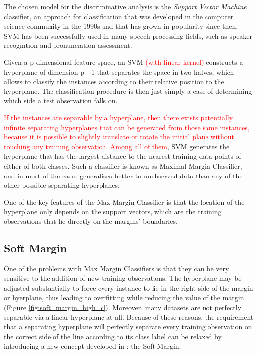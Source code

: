 
The chosen model for the discriminative analysis is the \textit{Support Vector Machine} classifier,
an approach for classification that was developed in the computer science community in the 1990s
and that has grown in popularity since then. SVM has been successfully used in many
speech processing fields, such as speaker recognition and pronunciation assessment.

Given a p-dimensional feature space, an SVM \textcolor{red}{(with linear kernel)}
constructs a hyperplane of dimension p - 1
that separates the space in two halves, which allows to classify the instances according
to their relative position to the hyperplane. The classification
procedure is then just simply a case of determining which side a test observation falls on.

\textcolor{red}{
If the instances are separable by a hyperplane, then there exists potentially infinite
separating hyperplanes that can be generated from those same instances, because it
is possible to slightly translate or rotate the initial plane without touching any training
observation. Among all of them}, SVM generates the hyperplane that has the largest
distance to the nearest training data points of either of both classes. Such a classifier
is known as Maximal Margin Classifier, and in most of the cases generalizes better to
unobserved data than any of the other possible separating hyperplanes.

One of the key features of the Max Margin Classifier is that the location of the hyperplane
only depends on the support vectors, which are the training observations that lie directly
on the margins' boundaries.

\subsection{Soft Margin}

One of the problems with Max Margin Classifiers is that they can be very sensitive to the
addition of new training observations: The hyperplane may be adjusted substantially
to force every instance to lie in the right side of the margin or hyerplane, thus leading
to overfitting while reducing the value of the margin (Figure \ref{fig:soft_margin_high_c}).
Moreover, many datasets are not perfectly separable via a linear hyperplane at all.
Because of these reasons, the requirement that a separating hyperplane will perfectly separate
every training observation on the correct side of the line according to its class label can
be relaxed by introducing a new concept developed in \cite{svm_soft_margin}: the Soft Margin.

